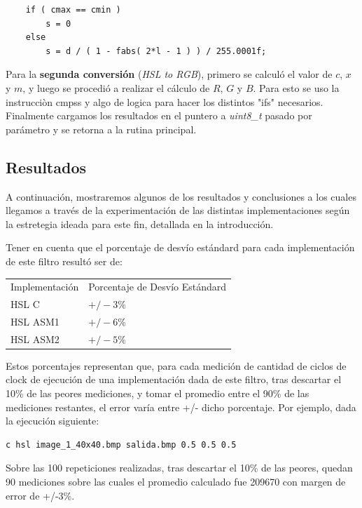 \begin{verbatim}
	if ( cmax == cmin )
	    s = 0
	else
	    s = d / ( 1 - fabs( 2*l - 1 ) ) / 255.0001f;

\end{verbatim}


Para la \textbf{segunda conversión} (\textit{HSL to RGB}), primero se calculó el valor de $c$, $x$ y $m$, y luego se procedió a realizar el cálculo de $R$, $G$ y $B$. Para esto se uso la instrucciòn cmpss y algo de logica para hacer los distintos "ifs" necesarios.\\
Finalmente cargamos los resultados en el puntero a \textit{uint8\_t} pasado por parámetro y se retorna a la rutina principal.\\

\subsection{Resultados}
A continuación, mostraremos algunos de los resultados y conclusiones a los cuales llegamos a través de la experimentación de las distintas implementaciones según la estretegia ideada para este fin, detallada en la introducción.

Tener en cuenta que el porcentaje de desvío estándard para cada implementación de este filtro resultó ser de:
\begin{tabular}{| l | l |}
\hline
Implementación & Porcentaje de Desvío Estándard \\
HSL C	& $+/- 3\%$\\
HSL ASM1 & 	$+/- 6\%$\\
HSL ASM2	& $+/- 5\%$\\
\hline
\end{tabular}

Estos porcentajes representan que, para cada medición de cantidad de ciclos de clock de ejecución de una implementación dada de este filtro, tras descartar el 10\% de las peores mediciones, y tomar el promedio entre el 90\% de las mediciones restantes, el error varía entre +/- dicho porcentaje. Por ejemplo, dada la ejecución siguiente:

\begin{verbatim}
c hsl image_1_40x40.bmp salida.bmp 0.5 0.5 0.5
\end{verbatim}
Sobre las 100 repeticiones realizadas, tras descartar el 10\% de las peores, quedan 90 mediciones sobre las cuales el promedio calculado fue 209670 con margen de error de +/-3\%.\\


